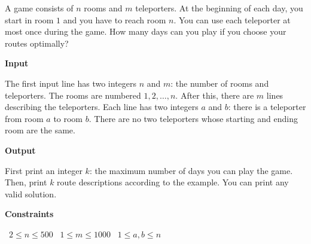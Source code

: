 A game consists of $n$ rooms and $m$ teleporters. At the beginning of each day, you start in room $1$ and you have to reach room $n$.
You can use each teleporter at most once during the game. How many days can you play if you choose your routes optimally?

\vspace{0.3cm}\noindent\textbf{Input}

The first input line has two integers $n$ and $m$: the number of rooms and teleporters. The rooms are numbered $1,2,\dots,n$.
After this, there are $m$ lines describing the teleporters. Each line has two integers $a$ and $b$: there is a teleporter from room $a$ to room $b$.
There are no two teleporters whose starting and ending room are the same.

\vspace{0.3cm}\noindent\textbf{Output}

First print an integer $k$: the maximum number of days you can play the game. Then, print $k$ route descriptions according to the example. You can print any valid solution.

\vspace{0.3cm}\noindent\textbf{Constraints}

\textbullet\ $2 \le n \le 500$
\textbullet\ $1 \le m \le 1000$
\textbullet\ $1 \le a,b \le n$